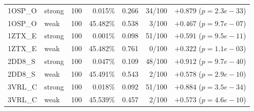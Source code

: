 \documentclass[11pt,a4paper]{article}
\begin{document}
\begin{table}[h]
\begin{tabular}{@{}llrrrrr@{}}
1OSP\_O & strong & 100 & 0.015\% & 0.266 & 34/100 & $+0.879$ ($p = 2.3e-33$) \\
1OSP\_O & weak & 100 & 45.482\% & 0.538 & 3/100 & $+0.467$ ($p = 9.7e-07$) \\
1ZTX\_E & strong & 100 & 0.001\% & 0.098 & 51/100 & $+0.591$ ($p = 9.5e-11$) \\
1ZTX\_E & weak & 100 & 45.482\% & 0.761 & 0/100 & $+0.322$ ($p = 1.1e-03$) \\
2DD8\_S & strong & 100 & 0.047\% & 0.109 & 48/100 & $+0.912$ ($p = 9.7e-40$) \\
2DD8\_S & weak & 100 & 45.491\% & 0.543 & 2/100 & $+0.578$ ($p = 2.9e-10$) \\
3VRL\_C & strong & 100 & 0.018\% & 0.092 & 51/100 & $+0.884$ ($p = 3.5e-34$) \\
3VRL\_C & weak & 100 & 45.539\% & 0.457 & 2/100 & $+0.573$ ($p = 4.6e-10$) \\
\bottomrule
\end{tabular}
\end{table}
\end{document}
